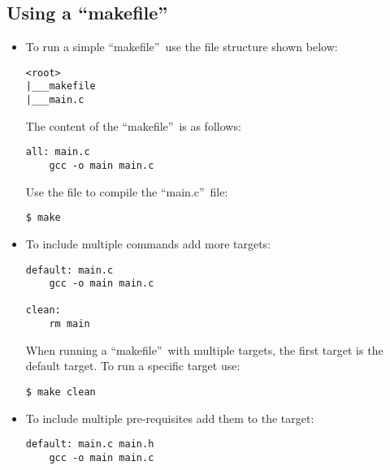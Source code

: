 \subsection{Using a \textquotedblleft makefile\textquotedblright}
\begin{itemize}
    \item To run a simple \textquotedblleft makefile\textquotedblright\ use the
    file structure shown below:
    \begin{verbatim}
<root>
|___makefile
|___main.c
    \end{verbatim}
    The content of the \textquotedblleft makefile\textquotedblright\ is as
    follows:
    \begin{verbatim}
all: main.c
    gcc -o main main.c
    \end{verbatim}
    Use the file to compile the \textquotedblleft main.c\textquotedblright\ 
    file:
    \begin{verbatim}
$ make
    \end{verbatim}
    \item To include multiple commands add more targets:
    \begin{verbatim}
default: main.c
    gcc -o main main.c

clean:
    rm main
    \end{verbatim}
    When running a \textquotedblleft makefile\textquotedblright\ with multiple
    targets, the first target is the default target. To run a specific target
    use:
    \begin{verbatim}
$ make clean
    \end{verbatim}
    \newpage
    \item To include multiple pre-requisites add them to the target:
    \begin{verbatim}
default: main.c main.h
    gcc -o main main.c
    \end{verbatim}
\end{itemize}

